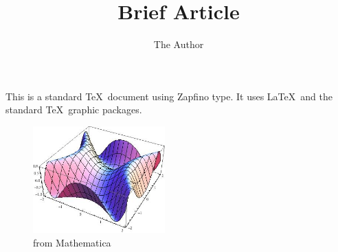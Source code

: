 \documentclass[12pt]{article}
\title{Brief Article}
\author{The Author}
\begin{document}
\maketitle

This is a standard \TeX\ document using Zapfino type. It uses \LaTeX\ and
the standard \TeX\ graphic packages.

\begin{figure}[htbp] 
   \centering
   \includegraphics[width=2in]{XeTeX-2.jpg} 
   \caption{from Mathematica}
\end{figure}
\end{document}
